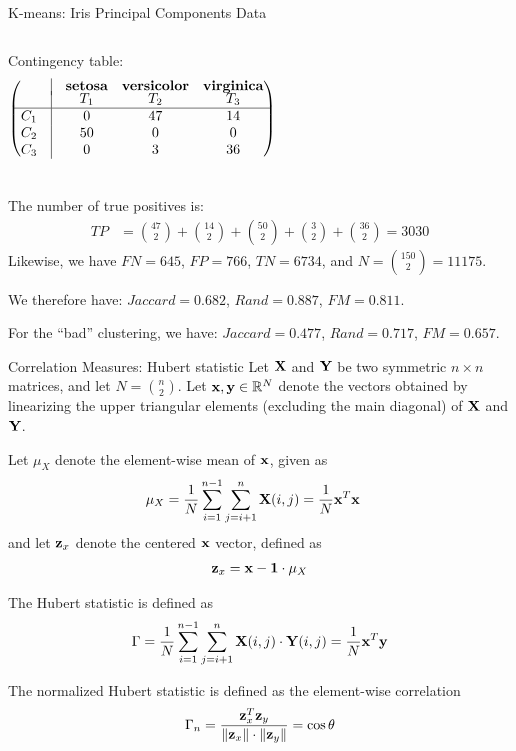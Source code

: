 \begin{frame}[fragile]{K-means: Iris Principal Components Data}
\begin{columns}
Contingency table:
\small
\begin{align*}
  \matr{ & \vline& \textbf{setosa} & \textbf{versicolor} &
  \textbf{virginica}\\[-3pt]
  & \vline & T_1 & T_2 & T_3\\
  \hline
C_1 &\vline& 0 & 47 & 14\\
C_2 &\vline& 50 &  0 &  0\\
C_3 &\vline& 0 &  3 & 36\\
}
\end{align*}
\end{columns}
The number of true
positives is:
\begin{align*}
  \mathit{TP} & = {47 \choose 2} + {14 \choose 2} + {50 \choose 2} + {3 \choose 2}
  + {36 \choose 2} = 3030
\end{align*}
Likewise, we have
$\mathit{FN} = 645$, 
$\mathit{FP} = 766$,
$\mathit{TN} =6734$, and $N = {150 \choose 2} = 11175$.

We therefore have:
$\mathit{Jaccard} = 0.682$, $\mathit{Rand}=0.887$, 
$\mathit{FM} = 0.811$.

For the ``bad'' clustering, we have:
$\mathit{Jaccard} = 0.477$, $\mathit{Rand}=0.717$, 
$\mathit{FM} = 0.657$.

\end{frame}


\begin{frame}{Correlation Measures: Hubert statistic}
\small
  Let $\mathbf{X}$ and $\mathbf{Y}$ be two symmetric $n \times n$ matrices,
and let $N = {n \choose 2}$.
Let $\mathbf{x}, \mathbf{y} \in {\mathord{\mathbb R}}^{N}$ denote the
vectors obtained by
linearizing the upper triangular elements (excluding the main diagonal)
of $\mathbf{X}$ and $\mathbf{Y}$.

\medskip
Let $\mu_X$ denote the element-wise mean of $\mathbf{x}$,
given as
\begin{align*}
  \mu_X & = \frac{1}{N}\sum_{i=1}^{n-1}\sum_{j=i+1}^n
  \mathbf{X}(i,j) = \frac{1}{N} \mathbf{x}^T\mathbf{x}
\end{align*}
and let $\mathbf{z}_x$ denote the centered $\mathbf{x}$ vector, def\/{i}ned as
\begin{align*}
  \mathbf{z}_x = \mathbf{x} - \mathbf{1} \cdot \mu_X
\end{align*}

\medskip
The Hubert statistic is def\/{i}ned as 
\begin{align*}
  \Gamma =
  \frac{1}{N} \sum_{i=1}^{n-1} \sum_{j=i+1}^n
\mathbf{X}(i,j)\cdot \mathbf{Y}(i,j) = \frac{1}{N} \mathbf{x}^T\mathbf{y}
\end{align*}

\medskip
The normalized Hubert statistic is def\/{i}ned as the
element-wise correlation
\begin{align*}
  \Gamma_n =  \frac{\mathbf{z}_x^T \mathbf{z}_y}{\left\lVert\mathbf{z}_x\right\rVert \cdot \left\lVert\mathbf{z}_y\right\rVert} =
  \cos \theta
\end{align*}
\end{frame}



